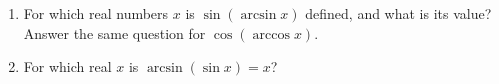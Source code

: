 \begin{enumerate}
\item[(a)] For which real numbers $x$ is $\sin(\arcsin x)$ defined, and what is its value? Answer the same question for $\cos(\arccos x)$.
\item[(b)] For which real $x$ is $\arcsin(\sin x)=x$?
\end{enumerate}
